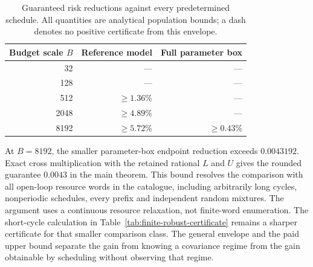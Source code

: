 \begin{table}[t]
\centering
\caption{Guaranteed risk reductions against every predetermined schedule.
All quantities are analytical population bounds; a dash denotes no positive certificate from this envelope.}
\label{tab:arbitrary-schedule}
\begin{tabular}{rrr}
\toprule
Budget scale $B$ & Reference model & Full parameter box\\
\midrule
32 & --- & ---\\
128 & --- & ---\\
512 & $\ge1.36\%$ & ---\\
2048 & $\ge4.89\%$ & ---\\
8192 & $\ge5.72\%$ & $\ge0.43\%$\\
\bottomrule
\end{tabular}
\end{table}

At $B=8192$, the smaller parameter-box endpoint reduction exceeds $0.0043192$.
Exact cross multiplication with the retained rational $L$ and $U$ gives the rounded guarantee $0.0043$ in the main theorem.
This bound resolves the comparison with all open-loop resource words in the catalogue, including arbitrarily long cycles, nonperiodic schedules, every prefix and independent random mixtures.
The argument uses a continuous resource relaxation, not finite-word enumeration.
The short-cycle calculation in Table~\ref{tab:finite-robust-certificate} remains a sharper certificate for that smaller comparison class.
The general envelope and the paid upper bound separate the gain from knowing a covariance regime from the gain obtainable by scheduling without observing that regime.
